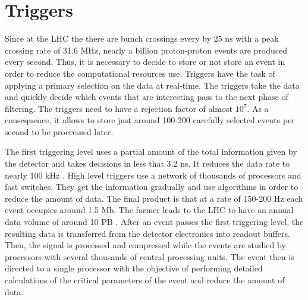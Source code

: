 \section{Triggers}

Since at the LHC the there are bunch crossings every by 25 ns with a peak crossing rate of 31.6 MHz, nearly a billion proton-proton events are produced every second. Thus, it is necessary to decide
to store or not store an event in order to reduce the computational resources use. Triggers have the task of applying a primary selection on the data at real-time. The triggers take the data and quickly 
decide which events that are interesting pass to the next phase of filtering. The triggers need to have a rejection factor of almost $10^7$. As a consequence, it allows to store just around 100-200 
carefully selected events per second to be proccessed later. 

The first triggering level uses a partial amount of the total information given by the detector and takes decisions in less that 3.2 ns. 
It reduces the data rate to nearly 100 kHz \cite{LHC_collitions_web}. High level triggers use a network of thousands of processors and fast switches. They get the information gradually and use algorithms in order to reduce 
the amount of data. The final product is that at a rate of 150-200 Hz each event occupies around 1.5 Mb. The former leads to the LHC to have an annual data volume of around 10 PB \cite{Perspectives_LHC}. After an event 
passes the first triggering level, the resulting data is transferred from the detector electronics into readout buffers. Then, the signal is processed and compressed while the events are studied by 
processors with several thousands of central processing units. The event then is directed to a single processor with the objective of performing detailed calculations of the critical parameters of the 
event and reduce the amount of data.






